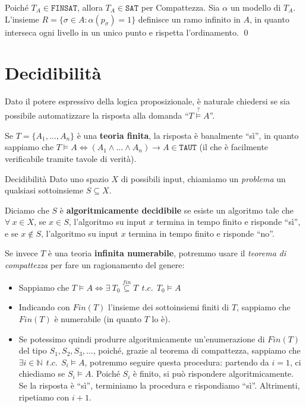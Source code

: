 \documentclass[a4paper,11pt]{report}
\newcommand{\SAT}{\texttt{SAT}}
\newcommand{\FINSAT}{\texttt{FINSAT}}
\begin{document}
Poiché \( T_A \in \FINSAT \), allora \( T_A \in \SAT \) per Compattezza.
Sia \( \alpha \) un modello di \( T_A \). L'insieme \( R = \{ \sigma \in A : \alpha(p_\sigma)=1 \} \) definisce un ramo infinito in \( A \), in quanto interseca ogni livello in un unico punto e rispetta l'ordinamento. \qed

\pagebreak

\section{Decidibilità}

Dato il potere espressivo della logica proposizionale, è naturale chiedersi se sia possibile automatizzare la risposta alla domanda ``\( T\overset{?}{\vDash} A \)''. 

Se \( T = \{A_1, \dots, A_n\} \) è una \textbf{teoria finita}, la risposta è banalmente ``sì'', in quanto sappiamo che \( T\vDash A \iff (A_1 \land \dots \land A_n) \to A \in \texttt{TAUT} \) (il che è facilmente verificabile tramite tavole di verità).

\begin{defframe}{Decidibilità}{}
        Dato uno spazio \( X \) di possibili input, chiamiamo un \textit{problema} un qualsiasi sottoinsieme \( S \subseteq X\). 

    Diciamo che \( S \) è \textbf{algoritmicamente decidibile} se esiste un algoritmo tale che \( \forall \ x \in X \), se \( x \in S \), l'algoritmo su input \( x \) termina in tempo finito e risponde ``sì'', e se \( x \not\in S \), l'algoritmo su input \( x \) termina in tempo finito e risponde ``no''.
\end{defframe}

Se invece \( T \) è una teoria \textbf{infinita numerabile}, potremmo usare il \textit{teorema di compattezza} per fare un ragionamento del genere:
\begin{itemize}
    \item Sappiamo che \( T \vDash A \iff \exists \ T_0 \overset{fin}{\subseteq} T  \ \ t.c. \ \ T_0 \vDash A\) 
    \item Indicando con \( Fin(T) \) l'insieme dei sottoinsiemi finiti di \( T \), sappiamo che \( Fin(T) \) è numerabile (in quanto \( T \) lo è). 
    \item Se potessimo quindi produrre algoritmicamente un'enumerazione di \( Fin(T) \) del tipo \( S_1, S_2, S_3, \dots \), poiché, grazie al teorema di compattezza, sappiamo che \( \exists i \in \mathbb{N} \ \ t.c. \ \ S_i \vDash A\), potremmo seguire questa procedura:
        \subitem partendo da \( i = 1 \), ci chiediamo se \( S_i \vDash A \). Poiché \( S_i \) è finito, si può rispondere algoritmicamente. Se la risposta è ``sì'', terminiamo la procedura e rispondiamo ``sì''. Altrimenti, ripetiamo con \( i+1 \).
\end{itemize}
\end{document}
